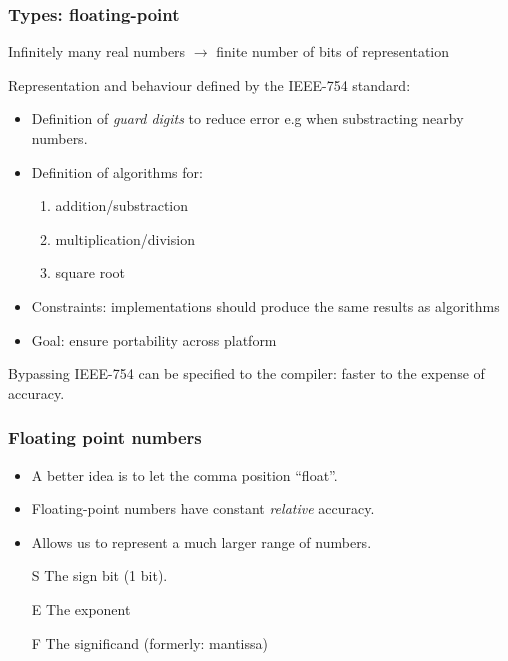 \begin{frame}
  \frametitle{Types: floating-point}

\begin{center}
Infinitely many real numbers $\rightarrow$ finite number of bits of representation
\end{center}

Representation and behaviour defined by the IEEE-754 standard:
\begin{itemize}
\item Definition of \textit{guard digits} to reduce error e.g when substracting nearby numbers.
\item Definition of algorithms for:
\begin{enumerate}
\item addition/substraction
\item multiplication/division
\item square root
\end{enumerate}
\end{itemize}

\medskip
\begin{itemize}
\item Constraints: implementations should produce the same results as algorithms
\item Goal: ensure portability across platform
\end{itemize}

\medskip
Bypassing IEEE-754 can be specified to the compiler: faster to the expense of accuracy.

\end{frame}

\begin{frame}
  \frametitle{Floating point numbers}
  \begin{itemize}
  \item A better idea is to let the comma position ``float''.
  \item Floating-point numbers have constant \emph{relative} accuracy.
  \item Allows us to represent a much larger range of numbers.
  \end{itemize}
  \begin{center}
    
  \end{center}
  \begin{itemize}
    \item[S] The sign bit (1 bit).
    \item[E] The exponent
    \item[F] The significand (formerly: mantissa)
  \end{itemize}
\end{frame}


